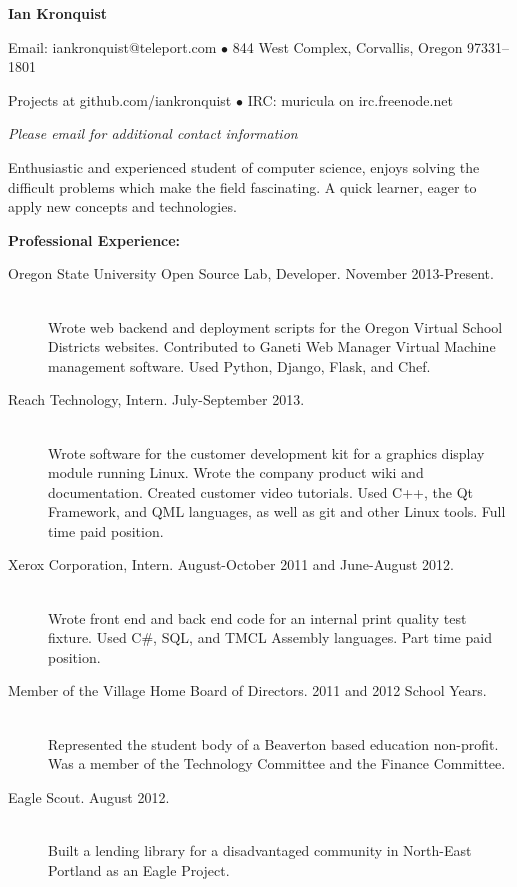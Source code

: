 \documentclass[11pt]{article}
\begin{document}
\centerline{{\LARGE \bf Ian Kronquist}}

\bigskip

\centerline{
	Email: iankronquist@teleport.com
	$\bullet$
	844 West Complex, Corvallis, Oregon 97331–1801
}
\centerline{
	Projects at github.com/iankronquist
	$\bullet$
        IRC: muricula on irc.freenode.net
}
\centerline{
        \emph{
		Please email for additional contact information
	}
}


\bigskip
\hrulefill
\bigskip

\large
Enthusiastic and experienced student of computer science, enjoys solving the 
difficult problems which make the field fascinating. A quick learner, eager 
to apply new concepts and technologies.

\bigskip

{\Large \bf Professional Experience:}
\normalsize
\begin{description}
	\item[Oregon State University Open Source Lab, Developer.
		\hfill November 2013-Present.]
		\hfill \\
		Wrote web backend and deployment scripts for the 
		Oregon Virtual School Districts websites. 
		Contributed to Ganeti Web Manager Virtual Machine 
		management software. Used Python, Django, Flask, and Chef. 
	\item[Reach Technology, Intern.
		\hfill July-September 2013.]
		\hfill \\
		Wrote software for the customer development kit for a graphics
		display module running Linux. Wrote the company product wiki 
		and documentation. Created customer video tutorials. Used C++,
		the Qt Framework, and QML languages, as well as git and other 
		Linux tools. Full time paid position. 
	\item[Xerox Corporation, Intern.
		\hfill  August-October 2011 and June-August 2012.]
		\hfill \\
		Wrote front end and back end code for an internal print quality
	 	test fixture.
		Used C\#, SQL, and TMCL Assembly languages.
		Part time paid position.  
	\item[Member of the Village Home Board of Directors.
		\hfill 2011 and 2012 School Years.]
		\hfill \\
		Represented the student body of a Beaverton based education 
		non-profit.
		Was a member of the Technology Committee and the Finance 
		Committee.
	\item[Eagle Scout.
		\hfill August 2012.]
		\hfill \\
		Built a lending library for a disadvantaged community in 
		North-East Portland as an Eagle Project.
\end{description}
\end{document}
